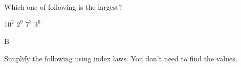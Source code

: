 \documentclass{quiz}
\begin{document}
\newpage


\begin{questions}

\question Which one of following is the largest? 

\begin{choices*}
    \choice $10^2$
    \choice $2^9$
    \choice $7^3$
    \choice $3^6$
\end{choices*}
\vspace{1cm} 
\begin{answers}
    B
\end{answers}

\question* Simplify the following using index laws. You don't need to find the values.

\begin{answers}
\end{answers}
\end{questions}
\end{document}
